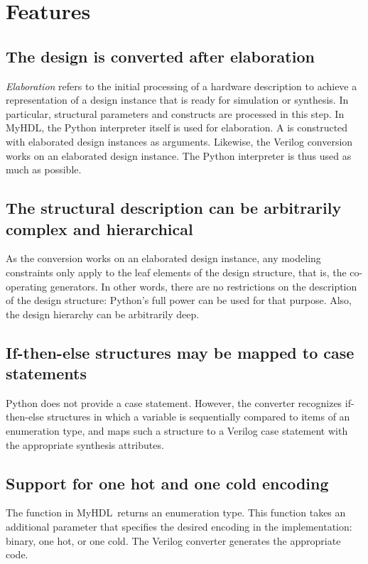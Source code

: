 \documentclass{howto}
\newcommand{\myhdl}{\protect \mbox{MyHDL}}
\begin{document}
\section{Features\label{section-features}}

\subsection{The design is converted after elaboration}
\emph{Elaboration} refers to the initial processing of
a hardware description to achieve a representation of a 
design instance that
is ready for simulation or synthesis. In particular, structural
parameters and constructs are processed in this step. In
\myhdl{}, the Python interpreter itself is used for elaboration.
A  is constructed with elaborated design
instances as arguments.
Likewise, the Verilog conversion works on an
elaborated design instance. The Python interpreter is thus used
as much as possible.

\subsection{The structural description can be arbitrarily complex and hierarchical}
As the conversion works on an elaborated design instance, any modeling
constraints only apply to the leaf elements of the design
structure, that is, the co-operating generators. In other words, there
are no restrictions on the description of the design structure:
Python's full power can be used for that purpose. Also, the
design hierarchy can be arbitrarily deep.

\subsection{If-then-else structures may be mapped to case statements}
Python does not provide a case statement. However, 
the converter recognizes if-then-else structures in which a variable is
sequentially compared to items of an enumeration type, and maps
such a structure to a Verilog case statement with the appropriate
synthesis attributes.

\subsection{Support for one hot and one cold encoding}
The  function in \myhdl\ returns an enumeration type. This
function takes an additional parameter  that specifies the
desired encoding in the implementation: binary, one hot, or one cold.
The Verilog converter generates the appropriate code.
\end{document}
